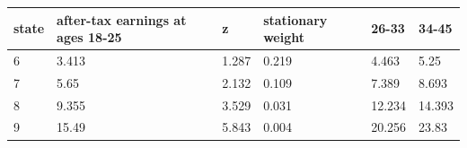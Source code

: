 \begingroup\small
\setlength{\tabcolsep}{3pt}
\renewcommand{\arraystretch}{1.04}
\begin{tabularx}{\linewidth}{XXXXXX}
\toprule
state & after-tax earnings at ages 18-25 & z & stationary weight & 26-33 & 34-45 \\
\midrule
6 & 3.413 & 1.287 & 0.219 & 4.463 & 5.25 \\
7 & 5.65 & 2.132 & 0.109 & 7.389 & 8.693 \\
8 & 9.355 & 3.529 & 0.031 & 12.234 & 14.393 \\
9 & 15.49 & 5.843 & 0.004 & 20.256 & 23.83 \\
\bottomrule
\end{tabularx}
\endgroup
